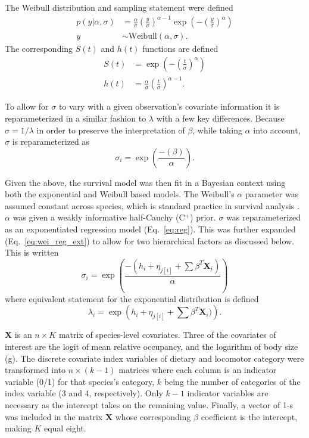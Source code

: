 \documentclass{pnastwo}
\begin{document}
\begin{article}
\begin{materials}
The Weibull distribution and sampling statement were defined
\begin{align}
  p(y | \alpha, \sigma) &= \frac{\alpha}{\sigma} \left(\frac{y}{\sigma}\right)^{\alpha - 1} \exp\left(-\left(\frac{y}{\sigma}\right)^{\alpha}\right) \nonumber \\
  y &\sim \mathrm{Weibull}(\alpha, \sigma).
  \label{eq:weibull}
\end{align}
The corresponding \(S(t)\) and \(h(t)\) functions are defined
\begin{align}
  S(t) &= \exp\left(-\left(\frac{t}{\sigma}\right)^{\alpha}\right) \label{eq:wei_surv} \\
  h(t) &= \frac{\alpha}{\sigma}\left(\frac{t}{\sigma}\right)^{\alpha - 1} \label{eq:wei_haz}.
\end{align}

To allow for \(\sigma\) to vary with a given observation's covariate information it is reparameterized in a similar fashion to \(\lambda\) with a few key differences. Because \(\sigma = 1/\lambda\) in order to preserve the interpretation of \(\beta\), while taking \(\alpha\) into account, \(\sigma\) is reparameterized as
\begin{equation}
  \sigma_{i} = \exp\left(\frac{-(\beta)}{\alpha}\right).
  \label{eq:reg}
\end{equation}

Given the above, the survival model was then fit in a Bayesian context using both the exponential and Weibull based models. The Weibull's \(\alpha\) parameter was assumed constant across species, which is standard practice in survival analysis \cite{Klein2003}. \(\alpha\) was given a weakly informative half-Cauchy (C\(^{+}\)) prior. \(\sigma\) was reparameterized as an exponentiated regression model (Eq.~\ref{eq:reg}). This was further expanded (Eq.~\ref{eq:wei_reg_ext}) to allow for two hierarchical factors as discussed below. This is written
\begin{equation}
  \sigma_{i} = \exp\left(\frac{-(h_{i} + \eta_{j[i]} + \sum \beta^{T} \mathbf{X}_{i})}{\alpha}\right)
  \label{eq:wei_reg_ext}
\end{equation}
where equivalent statement for the exponential distribution is defined
\begin{equation}
  \lambda_{i} = \exp\left(h_{i} + \eta_{j[i]} + \sum \beta^{T} \mathbf{X}_{i})\right).
  \label{eq:exp_reg_ext}
\end{equation}

\(\mathbf{X}\) is an \(n \times K\) matrix of species-level covariates. Three of the covariates of interest are the logit of mean relative occupancy, and the logarithm of body size (g). The discrete covariate index variables of dietary and locomotor category were transformed into \(n \times (k - 1)\) matrices where each column is an indicator variable (0/1) for that species's category, \(k\) being the number of categories of the index variable (3 and 4, respectively). Only \(k - 1\) indicator variables are necessary as the intercept takes on the remaining value. Finally, a vector of 1-s was included in the matrix \(\mathbf{X}\) whose corresponding \(\beta\) coefficient is the intercept, making \(K\) equal eight.


\end{materials}
\end{article}
\end{document}
